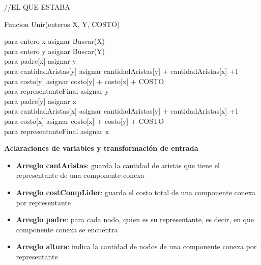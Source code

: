 //EL QUE ESTABA


\begin{algorithm}[H] %
 \caption{Funcion Unir(enteros X, Y, COSTO)}
 	para entero x asignar Buscar(X)\\
 	para entero y asignar Buscar(Y)\\
	 {
	 	para padre[x] asignar y\\
 	para cantidadAristas[y] asignar cantidadAristas[y] + cantidadAristas[x] +1\\
 	para costo[y] asignar costo[y] + costo[x] + COSTO\\
 	 	 {
            para representanteFinal asignar y\\
        }
	}{ 	 	para padre[y] asignar x\\
 	para cantidadAristas[x] asignar cantidadAristas[y] + cantidadAristas[x] +1\\
 	para costo[x] asignar costo[x] + costo[y] + COSTO\\
 	  {
           para representanteFinal asignar x\\
        }	}
 
\end{algorithm}

\textbf{Aclaraciones de variables y transformaci\'on de entrada}

\begin{itemize}

\item {\bf Arreglo cantAristas}: guarda la cantidad de aristas que tiene el representante de una componente conexa
\item {\bf Arreglo costCompLider}: guarda el costo total de una componente conexa por representante 
\item {\bf Arreglo padre}: para cada nodo, quien es su representante, es decir, en que componente conexa se encuentra
\item {\bf Arreglo altura}: indica la cantidad de nodos de una componente conexa por representante
\end{itemize}  